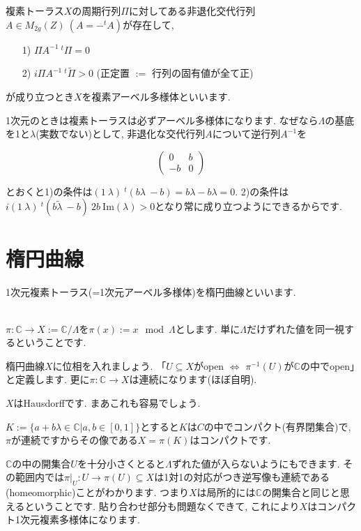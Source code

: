 \documentclass{jsarticle}
\def\Im{\mathrm{Im}}
\theoremstyle{definition}
\numberwithin{theorem}{section}
\begin{document}
複素トーラス$X$の周期行列$\Pi$に対してある非退化交代行列$A \in M_{2g}(Z)\ (A = -^tA)$が存在して, 
\begin{itemize}
\item[1)] $\Pi A^{-1}{\ }^t\Pi = 0$
\item[2)] $i \Pi A^{-1}{\ }^t\tilde\Pi > 0$ (正定置 $:=$ 行列の固有値が全て正)
\end{itemize}
が成り立つとき$X$を複素アーベル多様体といいます.

1次元のときは複素トーラスは必ずアーベル多様体になります. なぜなら$\Lambda$の基底を1と$\lambda$(実数でない)として, 非退化な交代行列$A$について逆行列$A^{-1}$を

\begin{equation*}
\begin{pmatrix}
0 & b \\
-b & 0
\end{pmatrix}
\end{equation*}

とおくと1)の条件は$(1\ \lambda)\ {}^t(b\lambda\ -b) = b\lambda - b\lambda = 0$.
2)の条件は$i(1\ \lambda)\ {}^t(b\tilde\lambda\ -b)\ 2b\ \Im(\lambda) > 0$となり常に成り立つようにできるからです.

\section{楕円曲線}
1次元複素トーラス(=1次元アーベル多様体)を楕円曲線といいます.

\hrulefill\\

$\pi: \mathbb{C}\rightarrow X := \mathbb{C}/\Lambda$を$\pi(x) := x \mod \Lambda$とします. 単に$\Lambda$だけずれた値を同一視するということです.

楕円曲線$X$に位相を入れましょう. 「$U\subseteq X$がopen $\Leftrightarrow$ $\pi^{-1}(U)$が$\mathbb{C}$の中でopen」と定義します. 更に$\pi: \mathbb{C} \rightarrow X$は連続になります(ほぼ自明).

$X$はHausdorffです. まあこれも容易でしょう.

$K := \{a+b\lambda \in \mathbb{C} | a, b \in [0, 1]\}$とすると$K$は$C$の中でコンパクト(有界閉集合)で, $\pi$が連続ですからその像である$X = \pi(K)$はコンパクトです.

$\mathbb{C}$の中の開集合$U$を十分小さくとると$\Lambda$ずれた値が入らないようにもできます. その範囲内では$\pi|_U: U \rightarrow \pi(U) \subseteq X$は1対1の対応がつき逆写像も連続である(homeomorphic)ことがわかります. つまり$X$は局所的には$\mathbb{C}$の開集合と同じと思えるということです. 貼り合わせ部分も問題なくできて, これにより$X$はコンパクト1次元複素多様体になります.
\end{document}
